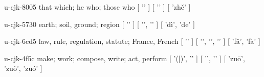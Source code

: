 \begin{multicols}{2}
\lettrine[lines=3]{\cjkgGlue{}}{}\begin{minipage}{0.8\linewidth} u-cjk-8005  that which; he who; those who  [ '\cjkgGlue{}' ]  [ '\cjkgGlue{}' ]  [ 'zhě' ] \end{minipage}

\lettrine[lines=3]{\cjkgGlue{}}{}\begin{minipage}{0.8\linewidth} u-cjk-5730  earth; soil, ground; region  [ '\cjkgGlue{}' ]  [ '\cjkgGlue{}', '\cjkgGlue{}' ]  [ 'dì', 'de' ] \end{minipage}

\lettrine[lines=3]{\cjkgGlue{}}{}\begin{minipage}{0.8\linewidth} u-cjk-6cd5  law, rule, regulation, statute; France, French  [ '\cjkgGlue{}' ]  [ '\cjkgGlue{}', '\cjkgGlue{}', '\cjkgGlue{}' ]  [ 'fǎ', 'fà' ] \end{minipage}

\lettrine[lines=3]{\cjkgGlue{}}{}\begin{minipage}{0.8\linewidth} u-cjk-4f5c  make; work; compose, write; act, perform  [ '\cjkgGlue{}(\cjkgGlue{}|\cjkgGlue{})', '\cjkgGlue{}' ]  [ '\cjkgGlue{}', '\cjkgGlue{}' ]  [ 'zuō', 'zuò', 'zuó' ] \end{minipage}


\end{multicols}

